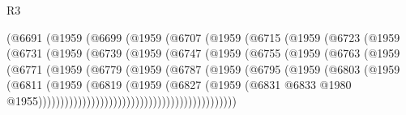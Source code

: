 \begin{lexlean}{R3}
\begin{coremodule}
                    (@6691
                      (@1959
                        (@6699
                          (@1959
                            (@6707
                              (@1959
                                (@6715
                                  (@1959
                                    (@6723
                                      (@1959
                                        (@6731
                                          (@1959
                                            (@6739
                                              (@1959
                                                (@6747
                                                  (@1959
                                                    (@6755
                                                      (@1959
                                                        (@6763
                                                          (@1959
                                                            (@6771
                                                              (@1959
                                                                (@6779
                                                                  (@1959
                                                                    (@6787
                                                                      (@1959
                                                                        (@6795
                                                                          (@1959
                                                                            (@6803
                                                                              (@1959
                                                                                (@6811
                                                                                  (@1959
                                                                                    (@6819
                                                                                      (@1959
                                                                                        (@6827
                                                                                          (@1959
                                                                                            (@6831
                                                                                              @6833
                                                                                              @1980
                                                                                              @1955)))))))))))))))))))))))))))))))))))))))))))))

\end{coremodule}
\end{lexlean}
